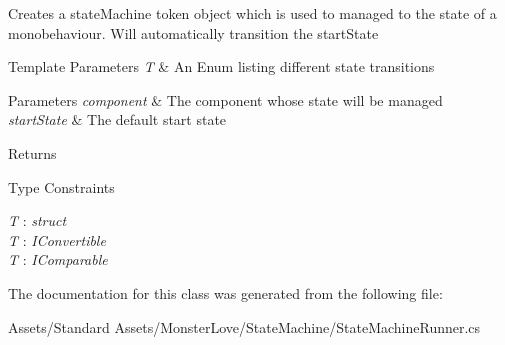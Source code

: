 Creates a state\+Machine token object which is used to managed to the state of a monobehaviour. Will automatically transition the start\+State 


\begin{DoxyTemplParams}{Template Parameters}
{\em T} & An Enum listing different state transitions\\
\hline
\end{DoxyTemplParams}

\begin{DoxyParams}{Parameters}
{\em component} & The component whose state will be managed\\
\hline
{\em start\+State} & The default start state\\
\hline
\end{DoxyParams}
\begin{DoxyReturn}{Returns}

\end{DoxyReturn}
\begin{Desc}
\item[Type Constraints]\begin{description}
\item[{\em T} : {\em struct}]\item[{\em T} : {\em I\+Convertible}]\item[{\em T} : {\em I\+Comparable}]\end{description}
\end{Desc}


The documentation for this class was generated from the following file\+:\begin{DoxyCompactItemize}
\item 
Assets/\+Standard Assets/\+Monster\+Love/\+State\+Machine/State\+Machine\+Runner.\+cs\end{DoxyCompactItemize}
